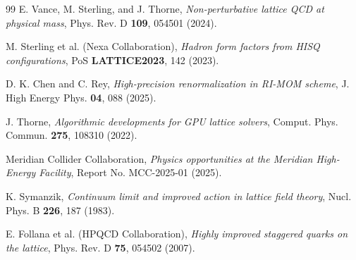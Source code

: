 \documentclass{proc}
\begin{document}
\begin{thebibliography}{99}
E. Vance, M. Sterling, and J. Thorne, \textit{Non-perturbative lattice QCD at physical mass}, Phys. Rev. D \textbf{109}, 054501 (2024).

M. Sterling et al. (Nexa Collaboration), \textit{Hadron form factors from HISQ configurations}, PoS \textbf{LATTICE2023}, 142 (2023).

D. K. Chen and C. Rey, \textit{High-precision renormalization in RI-MOM scheme}, J. High Energy Phys. \textbf{04}, 088 (2025).

J. Thorne, \textit{Algorithmic developments for GPU lattice solvers}, Comput. Phys. Commun. \textbf{275}, 108310 (2022).

Meridian Collider Collaboration, \textit{Physics opportunities at the Meridian High-Energy Facility}, Report No. MCC-2025-01 (2025).

K. Symanzik, \textit{Continuum limit and improved action in lattice field theory}, Nucl. Phys. B \textbf{226}, 187 (1983).

E. Follana et al. (HPQCD Collaboration), \textit{Highly improved staggered quarks on the lattice}, Phys. Rev. D \textbf{75}, 054502 (2007).
\end{thebibliography}
\end{document}
